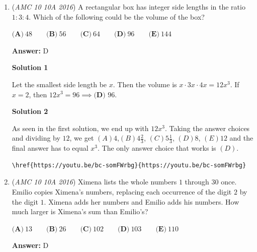 \begin{enumerate}
\textbf{Solution 2}

Do note that the denominator of the answer will be a multiple of 5 and 8 (40) and that the answer will also be negative. The only answer choice that satisfies this is $\boxed{B}$
\begin{verbatim}
\href{https://youtu.be/pu\_Hqo5sfWs}{https://youtu.be/pu\_Hqo5sfWs}
\end{verbatim}





	\item (\textit{AMC 10 10A 2016}) A rectangular box has integer side lengths in the ratio $1: 3: 4$. Which of the following could be the volume of the box?


 $\textbf{(A)}\ 48\qquad\textbf{(B)}\ 56\qquad\textbf{(C)}\ 64\qquad\textbf{(D)}\ 96\qquad\textbf{(E)}\ 144$

 \textbf{Answer: }D



\textbf{Solution 1}

Let the smallest side length be $x$. Then the volume is $x \cdot 3x \cdot 4x =12x^3$. If $x=2$, then $12x^3 = 96 \implies \boxed{\textbf{(D) } 96.}$




\textbf{Solution 2}

As seen in the first solution, we end up with $12x^3$. Taking the answer choices and dividing by $12$, we get $(A) 4$,$(B) 4 \frac{2}{3}$, $(C) 5 \frac{1}{3}$, $(D) 8$, $(E) 12$ and the final answer has to equal $x^3$. The only answer choice that works is $(D)$.

 \begin{verbatim}
\href{https://youtu.be/bc-somFWrbg}{https://youtu.be/bc-somFWrbg}
\end{verbatim}





	\item (\textit{AMC 10 10A 2016}) Ximena lists the whole numbers $1$ through $30$ once. Emilio copies Ximena's numbers, replacing each occurrence of the digit $2$ by the digit $1$. Ximena adds her numbers and Emilio adds his numbers. How much larger is Ximena's sum than Emilio's?


 $\textbf{(A)}\ 13\qquad\textbf{(B)}\ 26\qquad\textbf{(C)}\ 102\qquad\textbf{(D)}\ 103\qquad\textbf{(E)}\ 110$

 \textbf{Answer: }D




\end{enumerate}
